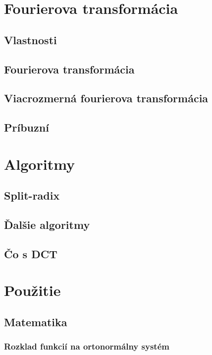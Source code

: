 



\chapter{Fourierova transformácia}
    
    
    
\section{Vlastnosti}
\section{Fourierova transformácia}
\section{Viacrozmerná fourierova transformácia}
\section{Príbuzní}

\chapter{Algoritmy}
    
    
    \section{Split-radix}
    
    
    \section{Ďalšie algoritmy}
    \section{Čo s DCT}


\chapter{Použitie}
\section{Matematika}
    \subsection{Rozklad funkcií na ortonormálny systém}
    
